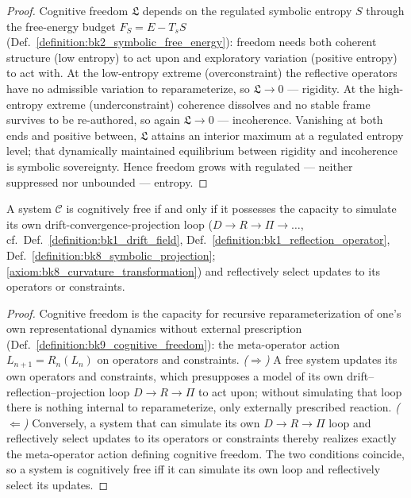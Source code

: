 \begin{proof}
\label{proof:bk9_freedomentropy_complementarity}
\leavevmode
Cognitive freedom $\mathfrak{L}$ depends on the regulated symbolic entropy $S$ through the free-energy budget $F_S=E-T_sS$ (Def.~\ref{definition:bk2_symbolic_free_energy}): freedom needs both coherent structure (low entropy) to act upon and exploratory variation (positive entropy) to act with. At the low-entropy extreme (overconstraint) the reflective operators have no admissible variation to reparameterize, so $\mathfrak{L}\to0$ --- rigidity. At the high-entropy extreme (underconstraint) coherence dissolves and no stable frame survives to be re-authored, so again $\mathfrak{L}\to0$ --- incoherence. Vanishing at both ends and positive between, $\mathfrak{L}$ attains an interior maximum at a regulated entropy level; that dynamically maintained equilibrium between rigidity and incoherence is symbolic sovereignty. Hence freedom grows with regulated --- neither suppressed nor unbounded --- entropy.
\end{proof}
\begin{corollary}
\label{corollary:bk9_selfreferential_capacity}
A system $\mathcal{C}$ is cognitively free if and only if it possesses the capacity to simulate its own drift-convergence-projection loop ($D \to R \to \Pi \to \dots$, cf.~Def.~\ref{definition:bk1_drift_field}, Def.~\ref{definition:bk1_reflection_operator}, Def.~\ref{definition:bk8_symbolic_projection}; \ref{axiom:bk8_curvature_transformation}) and reflectively select updates to its operators or constraints.
\end{corollary}
\begin{proof}
\label{proof:bk9_selfreferential_capacity}
\leavevmode
Cognitive freedom is the capacity for recursive reparameterization of one's own representational dynamics without external prescription (Def.~\ref{definition:bk9_cognitive_freedom}): the meta-operator action $L_{n+1}=R_n(L_n)$ on operators and constraints. \emph{($\Rightarrow$)} A free system updates its own operators and constraints, which presupposes a model of its own drift--reflection--projection loop $D\to R\to\Pi$ to act upon; without simulating that loop there is nothing internal to reparameterize, only externally prescribed reaction. \emph{($\Leftarrow$)} Conversely, a system that can simulate its own $D\to R\to\Pi$ loop and reflectively select updates to its operators or constraints thereby realizes exactly the meta-operator action defining cognitive freedom. The two conditions coincide, so a system is cognitively free iff it can simulate its own loop and reflectively select its updates.
\end{proof}
